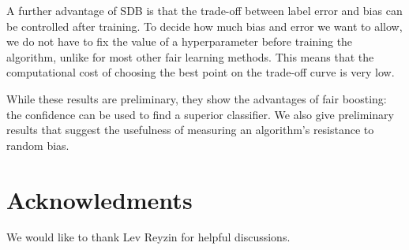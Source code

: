 \documentclass{article}
\begin{document}
A further advantage of SDB is that the trade-off between label error and bias
can be controlled after training.  To decide how much bias and error we want to
allow, we do not have to fix the value of a hyperparameter before training the
algorithm, unlike for most other fair learning methods. This means that the
computational cost of choosing the best point on the trade-off curve is very
low.

While these results are preliminary, they show the advantages of fair boosting:
the confidence can be used to find a superior classifier.  We also give preliminary
results that suggest the usefulness of measuring an algorithm's resistance to
random bias.

\section*{Acknowledments}
We would like to thank Lev Reyzin for helpful discussions.

\newpage


\end{document}
